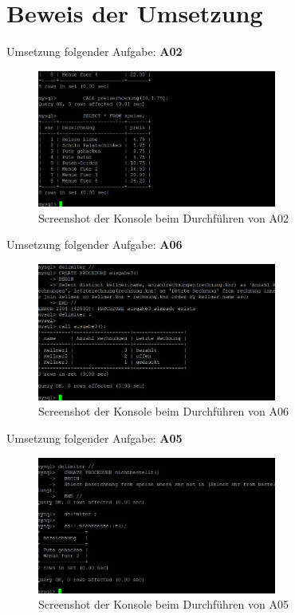 		
		
\section{Beweis der Umsetzung}
	Umsetzung folgender Aufgabe: \textbf{A02}
	\begin{figure}[!h]
		\begin{center}
			\includegraphics[width=0.7\textwidth]{images/A02}
			\caption{Screenshot der Konsole beim Durchführen von A02}
			\label{broker}
		\end{center}
	\end{figure}
	\clearpage
	Umsetzung folgender Aufgabe: \textbf{A06}
	\begin{figure}[!h]
		\begin{center}
			\includegraphics[width=0.7\textwidth]{images/A06}
			\caption{Screenshot der Konsole beim Durchführen von A06}
			\label{broker}
		\end{center}
	\end{figure}
	\newline
	Umsetzung folgender Aufgabe: \textbf{A05}
	\begin{figure}[!h]
		\begin{center}
			\includegraphics[width=0.7\textwidth]{images/A05}
			\caption{Screenshot der Konsole beim Durchführen von A05}
			\label{broker}
		\end{center}
	\end{figure}
	
	